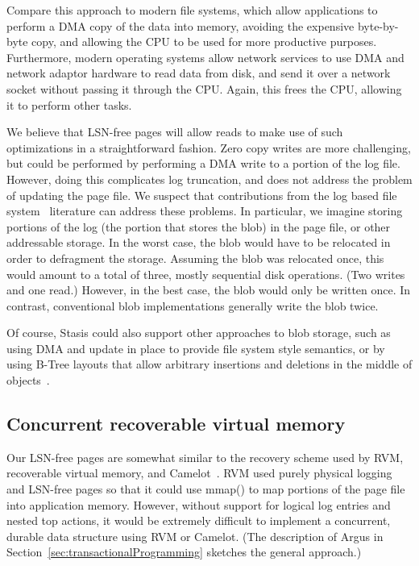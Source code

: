 \documentclass[letterpaper,twocolumn,10pt]{article}
\newcommand{\yad}{Stasis\xspace}
\begin{document}
Compare this approach to modern file systems, which allow applications to
perform a DMA copy of the data into memory, avoiding the expensive
byte-by-byte copy, and allowing the CPU to be used for
more productive purposes.  Furthermore, modern operating systems allow
network services to use DMA and network adaptor hardware to read data
from disk, and send it over a network socket without passing it
through the CPU.  Again, this frees the CPU, allowing it to perform
other tasks.

We believe that LSN-free pages will allow reads to make use of such
optimizations in a straightforward fashion.  Zero copy writes are more challenging, but could be
performed by performing a DMA write to a portion of the log file.
However, doing this complicates log truncation, and does not address
the problem of updating the page file.  We suspect that contributions
from the log based file system~\cite{lfs} literature can address these problems.
In particular, we imagine storing 
portions of the log (the portion that stores the blob) in the 
page file, or other addressable storage.  In the worst case, 
the blob would have to be relocated in order to defragment the 
storage.  Assuming the blob was relocated once, this would amount 
to a total of three, mostly sequential disk operations.  (Two 
writes and one read.)  However, in the best case, the blob would only be written once.
In contrast, conventional blob implementations generally write the blob twice. 

Of course, \yad could also support other approaches to blob storage,
such as using DMA and update in place to provide file system style
semantics, or by using B-Tree layouts that allow arbitrary insertions
and deletions in the middle of objects~\cite{esm}.

\subsection{Concurrent recoverable virtual memory}

Our LSN-free pages are somewhat similar to the recovery scheme used by
RVM, recoverable virtual memory, and Camelot~\cite{camelot}. RVM
used purely physical logging and LSN-free pages so that it
could use mmap() to map portions of the page file into application
memory\cite{lrvm}.  However, without support for logical log entries
and nested top actions, it would be extremely difficult to implement a
concurrent, durable data structure using RVM or Camelot.  (The description of
Argus in Section~\ref{sec:transactionalProgramming} sketches the
general approach.)  
\end{document}
